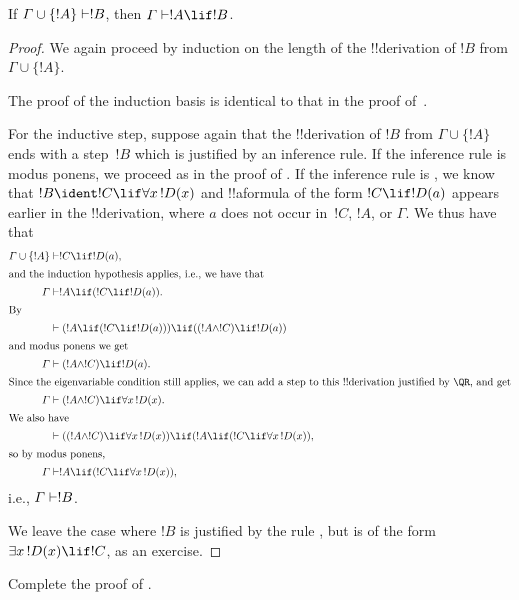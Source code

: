 \documentclass[../../../include/open-logic-section]{subfiles}
\begin{document}


\begin{thm}
 If $\Gamma \cup \{!A\} \Proves !B$,
then $\Gamma \Proves !A \lif !B$.
\end{thm}

\begin{proof}
We again proceed by induction on the length
of the !!{derivation} of $!B$ from $\Gamma \cup \{!A\}$.

The proof of the induction basis is identical to that in the proof
of~.

For the inductive step, suppose again that the !!{derivation} of $!B$
from $\Gamma \cup \{!A\}$ ends with a step~$!B$ which is justified by
an inference rule. If the inference rule is modus ponens, we proceed
as in the proof of . If the inference
rule is \QR, we know that $!B \ident !C \lif \lforall[x][!D(x)]$ and
!!a{formula} of the form $!C \lif !D(a)$ appears earlier in the
!!{derivation}, where $a$ does not occur in~$!C$, $!A$, or $\Gamma$. We
thus have that
\begin{align*}
  \Gamma \cup \{!A\} & \Proves !C \lif !D(a),\\
  \intertext{and the induction hypothesis applies, i.e., we have that}
    \Gamma & \Proves !A \lif (!C \lif !D(a)).\\
  \intertext{By}
  & \Proves (!A \lif (!C \lif !D(a))) \lif ((!A \land !C) \lif !D(a))\\
  \intertext{and modus ponens we get}
  \Gamma & \Proves (!A \land !C) \lif !D(a).\\
  \intertext{Since the eigenvariable condition still applies, we can add a step to this !!{derivation} justified by \QR, and get}
    \Gamma & \Proves (!A \land !C) \lif \lforall[x][!D(x)].\\
    \intertext{We also have}
    & \Proves ((!A \land !C) \lif \lforall[x][!D(x)]) \lif (!A \lif (!C \lif \lforall[x][!D(x)]),\\
    \intertext{so by modus ponens,}
    \Gamma & \Proves !A \lif (!C \lif \lforall[x][!D(x)]),
\end{align*}
i.e., $\Gamma \Proves !B$.

We leave the case where $!B$ is justified by the rule \QR, but is of
the form $\lexists[x][!D(x)] \lif !C$, as an exercise.
\end{proof}

\begin{prob}
  Complete the proof of .
\end{prob}
\end{document}
